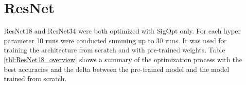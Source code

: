 \begin{figure}[!h]
\label{fig:vgg13_heatmap}
\end{figure}

\quad













\section{ResNet}

ResNet18 and ResNet34 were both optimized with SigOpt only. For each hyper parameter 10 runs were conducted summing up to 30 runs. It was used for training the architecture from scratch and with pre-trained weights. Table \ref{tbl:ResNet18_overview} shows a summary of the optimization process with the best accuracies and the delta between the pre-trained model and the model trained from scratch. \\



